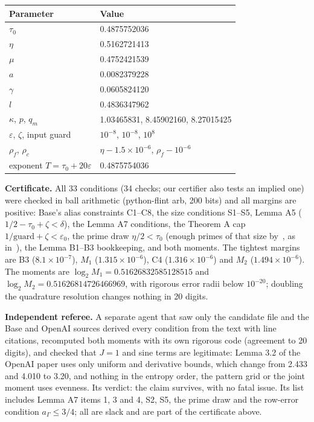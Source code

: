 \documentclass[11pt]{article}
\newcommand{\eps}{\varepsilon}
\theoremstyle{plain}
\begin{document}
\begin{center}
\small
\begin{tabular}{ll}
\toprule
Parameter & Value \\
\midrule
$\tau_0$ & 0.4875752036 \\
$\eta$ & 0.5162721413 \\
$\mu$ & 0.4752421539 \\
$a$ & 0.0082379228 \\
$\gamma$ & 0.0605824120 \\
$l$ & 0.4836347962 \\
$\kappa$, $p$, $q_m$ & 1.03465831, 8.45902160, 8.27015425 \\
$\eps$, $\zeta$, input guard & $10^{-8}$, $10^{-8}$, $10^{8}$ \\
$\rho_f$, $\rho_c$ & $\eta - 1.5\times10^{-6}$, $\rho_f - 10^{-6}$ \\
exponent $T = \tau_0 + 20\eps$ & 0.4875754036 \\
\bottomrule
\end{tabular}
\end{center}

\textbf{Certificate.} All 33 conditions (34 checks; our certifier also tests an implied one) were checked in ball arithmetic (python-flint arb, 200 bits) and all margins are positive: Base's alias constraints C1--C8, the size conditions S1--S5, Lemma A5 ($1/2 - \tau_0 + \zeta < \delta$), the Lemma A7 conditions, the Theorem A cap $1/\mathrm{guard} + \zeta < \eps_0$, the prime draw $\eta/2 < \tau_0$ (enough primes of that size by~\cite[Cor.~3]{rs}, as in~\cite{openai}), the Lemma B1--B3 bookkeeping, and both moments. The tightest margins are B3 ($8.1\times10^{-7}$), $M_1$ ($1.315\times10^{-6}$), C4 ($1.316\times10^{-6}$) and $M_2$ ($1.494\times10^{-6}$). The moments are $\log_2 M_1 = 0.51626832585128515$ and $\log_2 M_2 = 0.51626814726466969$, with rigorous error radii below $10^{-20}$; doubling the quadrature resolution changes nothing in 20 digits.

\textbf{Independent referee.} A separate agent that saw only the candidate file and the Base and OpenAI sources derived every condition from the text with line citations, recomputed both moments with its own rigorous code (agreement to 20 digits), and checked that $J = 1$ and sine terms are legitimate: Lemma 3.2 of the OpenAI paper uses only uniform and derivative bounds, which change from 2.433 and 4.010 to 3.20, and nothing in the entropy order, the pattern grid or the joint moment uses evenness. Its verdict: the claim survives, with no fatal issue. Its list includes Lemma A7 items 1, 3 and 4, S2, S5, the prime draw and the row-error condition $a_\Gamma \le 3/4$; all are slack and are part of the certificate above.
\end{document}
